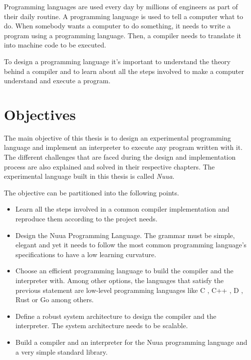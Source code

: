 Programming languages are used every day by millions of engineers as part of their daily routine.
A programming language is used to tell a computer what to do. When
somebody wants a computer to do something, it needs to write a program using a programming language. Then,
a compiler needs to translate it into machine code to be executed.

To design a programming language it's important to understand the theory behind a compiler and to learn about all the
steps involved to make a computer understand and execute a program.

\section{Objectives}
\label{sec:objectives}

The main objective of this thesis is to design an experimental programming language and implement an interpreter to execute
any program written with it. The different challenges that are faced during the design and implementation process are also explained and
solved in their respective chapters. The experimental language built in this thesis is called \emph{Nuua}.

The objective can be partitioned into the following points.

\begin{itemize}
    \item Learn all the steps involved in a common compiler implementation and reproduce them according to the project needs.
    \item Design the Nuua Programming Language. The grammar must be simple, elegant and yet it needs to follow the most
        common programming language's specifications to have a low learning curvature.
    \item Choose an efficient programming language to build the compiler and the interpreter with. Among other options, the languages that
    satisfy the previous statement are low-level programming languages like C \autocite{c_programming_language}, C++ \autocite{cpp_programming_language},
    D \autocite{d_programming_language}, Rust \autocite{rust_programming_language} or Go \autocite{go_programming_language} among others.
    \item Define a robust system architecture to design the compiler and the interpreter. The system architecture needs to be scalable.
    \item Build a compiler and an interpreter for the Nuua programming language and a very simple standard library.
\end{itemize}

